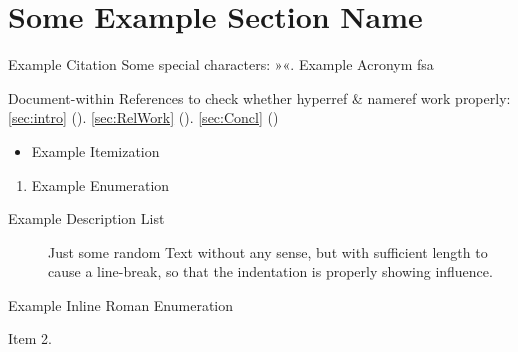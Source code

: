 



\section{Some Example Section Name}

Example Citation 
\cite{DenKr_denkrement1_indeco}
\nl%
Some special characters:
»«.
\nl%
\nl%
Example Acronym
\gls{fsa}

\npi%
Document-within References to check whether hyperref \& nameref work properly:\nl%
\ref{sec:intro} (). \ref{sec:RelWork}  (). \ref{sec:Concl} ()

\npi%
\begin{itemize}
\item%
    Example Itemization
\end{itemize}
\begin{enumerate}
\item%
    Example Enumeration
\end{enumerate}
\begin{description}
\item[Example Description List]%
    Just some random Text without any sense, but with sufficient length to cause a line-break, so that the indentation is properly showing influence.
\end{description}
\begin{enuminlrom}
\item%
    Example Inline Roman Enumeration
\item%
    Item 2.
\end{enuminlrom}

\npi%
{%
    \LARGE%
    \contourlength{0.03em}%
    \nl%
    {%
        \contourlength{0.2em}%
        \nl%
        \nl%
    }%
    \nl%
}%


